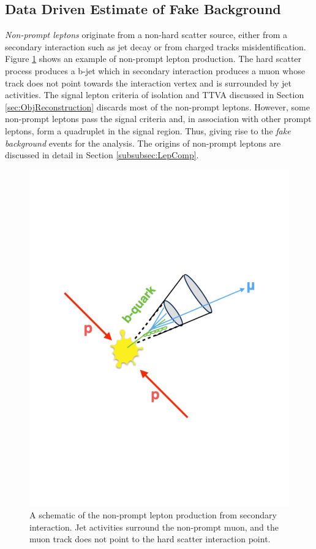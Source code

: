 \subsection{Data Driven Estimate of Fake Background}
\label{subsec:FakeBackground}

\textit{Non-prompt leptons} originate from a non-hard scatter source, either from a secondary interaction such as jet decay or from charged tracks misidentification. Figure \ref{fig:NonPromptLepton} shows an example of non-prompt lepton production. The hard scatter process produces a b-jet which in secondary interaction produces a muon whose track does not point towards the interaction vertex and is surrounded by jet activities. The signal lepton criteria of isolation and TTVA discussed in Section \ref{sec:ObjReconstruction} discards most of the non-prompt leptons. However, some non-prompt leptons pass the signal criteria and, in association with other prompt leptons, form a quadruplet in the signal region. Thus, giving rise to the \textit{fake background} events for the analysis. The origins of non-prompt leptons are discussed in detail in Section \ref{subsubsec:LepComp}.

\begin{figure}
    \centering
    \includegraphics[width=.8\linewidth]{figures/Analysis/Background/NonPromptLeptonExample.pdf}  
    \caption{A schematic of the non-prompt lepton production from secondary interaction. Jet activities surround the non-prompt muon, and the muon track does not point to the hard scatter interaction point.\label{fig:NonPromptLepton}}
\end{figure}

